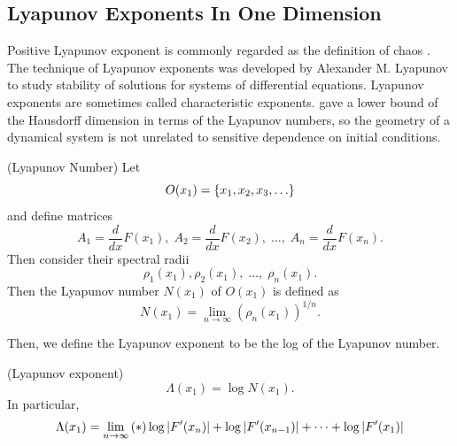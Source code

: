 \documentclass[12pt,twoside]{book}
\begin{document}
\subsection*{Lyapunov Exponents In One Dimension}
Positive Lyapunov exponent is commonly regarded as the definition of chaos \citep{kantz-schreiber}.
The technique of Lyapunov exponents was developed by Alexander M. Lyapunov to study stability of solutions for systems of differential equations.
Lyapunov exponents are sometimes called characteristic exponents.
\citet{young} gave a lower bound of the Hausdorff dimension in terms of the Lyapunov numbers, so the geometry of a dynamical system is not unrelated to sensitive dependence on initial conditions.
\begin{definition}
  (Lyapunov Number)
  Let
  \begin{equation*}
    O(x_1) = \left \{ x_1, x_2, x_3, \ldots \right \}
  \end{equation*}
  and define matrices
  \begin{equation*}
    A_1 = \frac{d}{dx}F(x_1),\; A_2 = \frac{d}{dx}F(x_2),\; \ldots,\; A_n = \frac{d}{dx}F(x_n).
  \end{equation*}
  Then consider their spectral radii
  \begin{equation*}
    \rho_1(x_1), \rho_2(x_1),\; \ldots,\; \rho_n(x_1).
  \end{equation*}
  Then the Lyapunov number $N(x_1)$ of $O(x_1)$ is defined as 
  \begin{equation*}
    N(x_1) = \lim\limits_{n \to \infty} (\rho_n(x_1))^{1/n}.
  \end{equation*}
\end{definition}
Then, we define the Lyapunov exponent to be the log of the Lyapunov number.
\begin{definition}
  (Lyapunov exponent)
  \begin{equation*}
    \Lambda(x_1) = \log N(x_1).
  \end{equation*}
  In particular,
  \begin{equation*}
    \Lambda(x_1) = \lim\limits_{n \to \infty} \left ( * \right ){\log\left | F'(x_n) \right | + \log\left | F'(x_{n-1}) \right | + \cdots + \log\left | F'(x_1) \right |}
  \end{equation*}
\end{definition}
\end{document}
